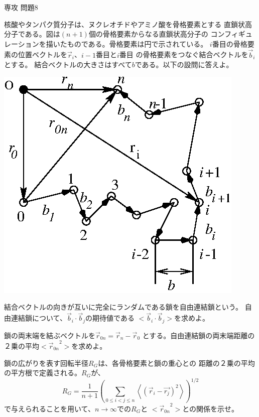 \documentclass[fleqn]{jbook}
\begin{document}
\begin{question}{専攻 問題8}{}

核酸やタンパク質分子は、ヌクレオチドやアミノ酸を骨格要素とする
直鎖状高分子である。図は$(n+1)$個の骨格要素からなる直鎖状高分子の
コンフィギュレーションを描いたものである。骨格要素は円で示されている。
$i$番目の骨格要素の位置ベクトルを$\vec{r}_i$、$i-1$番目と$i$番目
の骨格要素をつなぐ結合ベクトルを$\vec{b}_i$とする。
結合ベクトルの大きさはすべて$b$である。以下の設問に答えよ。

\begin{center}
  \mbox{\includegraphics[clip]{1994phy8-1.eps}}
\end{center}

\begin{subquestions}
\SubQuestion
  結合ベクトルの向きが互いに完全にランダムである鎖を自由連結鎖という。
自由連結鎖について、$\vec{b}_i\cdot\vec{b}_j$の期待値である
$<\vec{b}_i\cdot\vec{b}_j>$を求めよ。

\SubQuestion
  鎖の両末端を結ぶベクトルを$\vec{r}_{0n}=\vec{r}_n-\vec{r}_0$
とする。自由連結鎖の両末端距離の２乗の平均$<{\vec{r}_{0n}}^2>$を求めよ。

\SubQuestion
  鎖の広がりを表す回転半径$R_G$は、各骨格要素と鎖の重心との
距離の２乗の平均の平方根で定義される。$R_G$が、
\[R_G=\frac{1}{n+1}\left(\sum_{0\leq i<j\leq n}
\left\langle\left(\vec{r}_i-\vec{r_j}\right)^2\right\rangle\right)^{1/2}\]
で与えられることを用いて、$n\rightarrow \infty$での$R_G$と
$<{\vec{r}_{0n}}^2>$との関係を示せ。


\end{subquestions}
\end{question}
\end{document}
